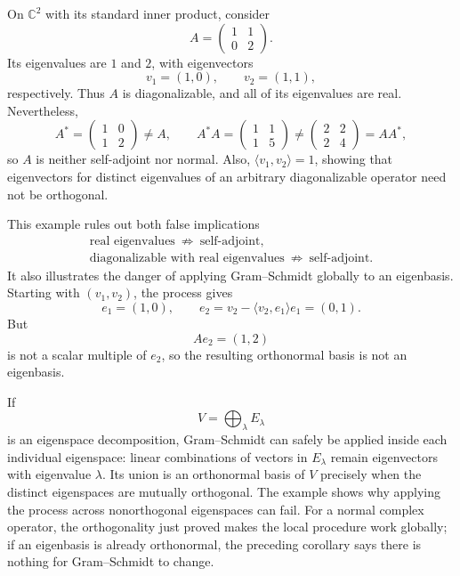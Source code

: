 \begin{example}
On \(\mathbb C^2\) with its standard inner product, consider
\[
A=\begin{pmatrix}1&1\\0&2\end{pmatrix}.
\]
Its eigenvalues are \(1\) and \(2\), with eigenvectors
\[
v_1=(1,0),
\qquad
v_2=(1,1),
\]
respectively.  Thus \(A\) is diagonalizable, and all of its eigenvalues are
real.  Nevertheless,
\[
A^*=\begin{pmatrix}1&0\\1&2\end{pmatrix}\ne A,
\qquad
A^*A=\begin{pmatrix}1&1\\1&5\end{pmatrix}
\ne
\begin{pmatrix}2&2\\2&4\end{pmatrix}=AA^*,
\]
so \(A\) is neither self-adjoint nor normal.  Also,
\(\langle v_1,v_2\rangle=1\), showing that eigenvectors for distinct
eigenvalues of an arbitrary diagonalizable operator need not be orthogonal.

This example rules out both false implications
\[
\begin{gathered}
\text{real eigenvalues}\ \not\Longrightarrow\ \text{self-adjoint},\\
\text{diagonalizable with real eigenvalues}\ \not\Longrightarrow\ \text{self-adjoint}.
\end{gathered}
\]
It also illustrates the danger of applying Gram--Schmidt globally to an
eigenbasis.  Starting with \((v_1,v_2)\), the process gives
\[
e_1=(1,0),
\qquad
e_2=v_2-\langle v_2,e_1\rangle e_1=(0,1).
\]
But
\[
Ae_2=(1,2)
\]
is not a scalar multiple of \(e_2\), so the resulting orthonormal basis is
not an eigenbasis.
\end{example}

\begin{remark}
If
\[
V=\bigoplus_\lambda E_\lambda
\]
is an eigenspace decomposition, Gram--Schmidt can safely be applied inside
each individual eigenspace: linear combinations of vectors in
\(E_\lambda\) remain eigenvectors with eigenvalue \(\lambda\).  Its union
is an orthonormal basis of \(V\) precisely when the distinct eigenspaces are
mutually orthogonal.  The example shows why applying the process across
nonorthogonal eigenspaces can fail.  For a normal complex operator, the
orthogonality just proved makes the local procedure work globally; if an
eigenbasis is already orthonormal, the preceding corollary says there is
nothing for Gram--Schmidt to change.
\end{remark}

